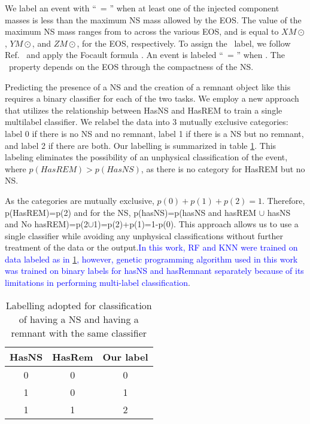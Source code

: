 We label an event with ``\hasns\ = \true'' when at least one of the injected component masses is less than the maximum \ac{NS} mass allowed by the \ac{EOS}. The value of the maximum \ac{NS}
mass ranges from  to  across the various \ac{EOS}, and is equal to $XM\odot$, $YM\odot$, and $ZM\odot$, for the  \ac{EOS}, respectively. To assign the
\hasrem\ label, we follow Ref.\  and apply the Focault formula . An event is labeled ``\hasrem\ = \true'' when . The \hasrem\ property
depends on the \ac{EOS} through the compactness of the \ac{NS}.


Predicting the presence of a NS and the creation of a remnant object like this requires a binary classifier for each of the two tasks. We employ a new approach that utilizes the relationship between HasNS and HasREM to train a single multilabel classifier. We relabel the data into 3 mutually exclusive categories: label 0 if there is no NS and no remnant, label 1 if there is a NS but no remnant, and label 2 if there are both. Our labelling is summarized in table \ref{tab:labels}. This labeling eliminates the possibility of an unphysical classification of the event, where $p(HasREM)>p(HasNS)$, as there is no category for HasREM but no NS.

As the categories are mutually exclusive, $p(0)+p(1)+p(2)=1$. Therefore, p(HasREM)=p(2) and for the NS, p(hasNS)=p(hasNS and hasREM $\cup$ hasNS and No hasREM)=p(2$\cup$1)=p(2)+p(1)=1-p(0). This approach allows us to use a single classifier while avoiding any unphysical classifications without further treatment of the data or the output.\textcolor{blue}{In this work, RF and KNN were trained on data labeled as in \ref{tab:labels}, however, genetic programming algorithm used in this work was trained on binary labels for hasNS and hasRemnant separately because of its limitations in performing multi-label classification}.

\begin{table}[h]
\centering
\begin{tabular}{@{}ccc@{}}
\toprule
HasNS & HasRem & Our label \\ \midrule
0     & 0      & 0         \\
1     & 0      & 1         \\
1     & 1      & 2         \\ \bottomrule
\end{tabular}
\caption{Labelling adopted for classification of having a NS and having a remnant with the same classifier}
\label{tab:labels}
\end{table}

